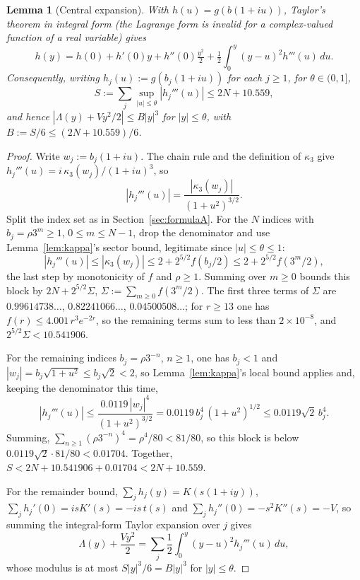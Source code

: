 \documentclass[11pt]{amsart}
\theoremstyle{plain}
\newtheorem{lemma}[theorem]{Lemma}
\theoremstyle{definition}
\theoremstyle{remark}
\begin{document}
\begin{lemma}[Central expansion]
\label{lem:taylor}
With $h(u) = g(b(1+iu))$, Taylor's theorem in \emph{integral} form (the Lagrange form is invalid
for a complex-valued function of a real variable) gives
\[
h(y) = h(0)+h'(0)y+h''(0)\tfrac{y^2}{2} + \tfrac12\int_0^y (y-u)^2 h'''(u)\,du.
\]
Consequently, writing $h_j(u) := g(b_j(1+iu))$ for each $j\ge1$, for $\theta\in(0,1]$,
\[
S := \sum_j \sup_{|u|\le \theta}|h_j'''(u)| \le 2N + 10.559,
\]
and hence $|\Lambda(y) + Vy^2/2| \le B|y|^3$ for $|y|\le \theta$, with $B := S/6 \le (2N+10.559)/6$.
\end{lemma}

\begin{proof}
Write $w_j := b_j(1+iu)$. The chain rule and the definition of
$\kappa_3$ give $h_j'''(u) = i\,\kappa_3(w_j)/(1+iu)^3$, so
\[
|h_j'''(u)| = \frac{|\kappa_3(w_j)|}{(1+u^2)^{3/2}}.
\]
Split the index set as in Section~\ref{sec:formulaA}. For the $N$ indices with $b_j = \rho3^m \ge
1$, $0\le m\le N-1$, drop the denominator and use Lemma~\ref{lem:kappa}'s sector bound, legitimate
since $|u|\le\theta\le1$:
\[
|h_j'''(u)| \le |\kappa_3(w_j)| \le 2 + 2^{5/2} f(b_j/2) \le 2 + 2^{5/2} f(3^m/2),
\]
the last step by monotonicity of $f$ and $\rho\ge1$. Summing over $m\ge0$ bounds this block by
$2N + 2^{5/2}\Sigma$, $\Sigma := \sum_{m\ge0} f(3^m/2)$. The first three terms of $\Sigma$ are
$0.99614738\ldots$, $0.82241066\ldots$, $0.04500508\ldots$; for $r\ge13$ one has $f(r) \le
4.001\,r^3e^{-2r}$, so the remaining terms sum to less than $2\times10^{-8}$, and $2^{5/2}\Sigma <
10.541906$.

For the remaining indices $b_j = \rho 3^{-n}$, $n\ge1$, one has $b_j<1$ and $|w_j| =
b_j\sqrt{1+u^2} \le b_j\sqrt2 < 2$, so Lemma~\ref{lem:kappa}'s local bound applies and, keeping
the denominator this time,
\[
|h_j'''(u)| \le \frac{0.0119\,|w_j|^4}{(1+u^2)^{3/2}} = 0.0119\,b_j^4\,(1+u^2)^{1/2} \le
0.0119\sqrt2\,b_j^4 .
\]
Summing, $\sum_{n\ge1}(\rho3^{-n})^4 = \rho^4/80 < 81/80$, so this block is below
$0.0119\sqrt2\cdot81/80 < 0.01704$. Together, $S < 2N + 10.541906 + 0.01704 < 2N + 10.559$.

For the remainder bound, $\sum_j h_j(y) = K(s(1+iy))$, $\sum_j h_j'(0) = isK'(s) = -is\,t(s)$ and
$\sum_j h_j''(0) = -s^2K''(s) = -V$, so summing the integral-form Taylor expansion over $j$ gives
\[
\Lambda(y) + \frac{Vy^2}{2} = \sum_j \frac12\int_0^y (y-u)^2 h_j'''(u)\,du,
\]
whose modulus is at most $S|y|^3/6 = B|y|^3$ for $|y|\le\theta$.
\end{proof}
\end{document}
